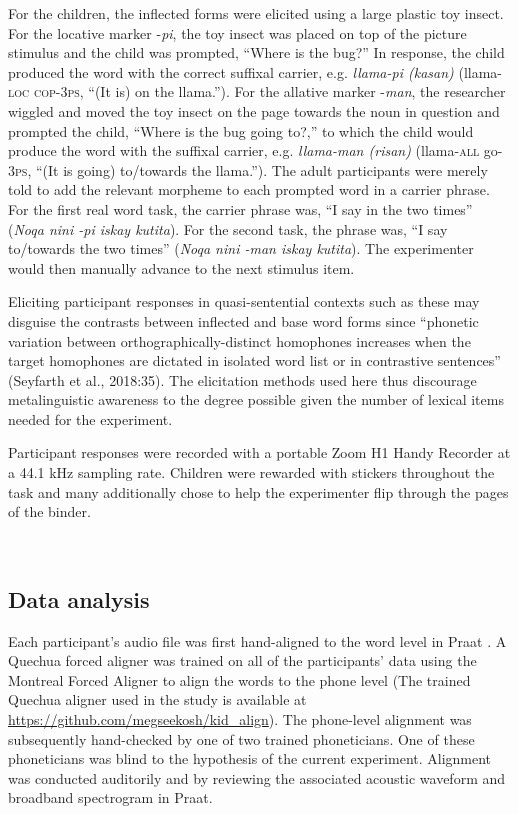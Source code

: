 \documentclass[a4paper,man,floatsintext,natbib,donotrepeattitle, apacite]{apa6}
\begin{document}
For the children, the inflected forms were elicited using a large plastic toy insect. For the locative marker -\textit{pi}, the toy insect was placed on top of the picture stimulus and the child was prompted, “Where is the bug?” In response, the child produced the word with the correct suffixal carrier, e.g. \textit{llama-pi (kasan)} (llama-\textsc{loc} \textsc{cop-3ps}, ``(It is) on the llama.''). For the allative marker -\textit{man}, the researcher wiggled and moved the toy insect on the page towards the noun in question and prompted the child, ``Where is the bug going to?,'' to which the child would produce the word with the suffixal carrier, e.g. \textit{llama-man (risan)} (llama-\textsc{all} go\textsc{-3ps}, ``(It is going) to/towards the llama.''). The adult participants were merely told to add the relevant morpheme to each prompted word in a carrier phrase. For the first real word task, the carrier phrase was, ``I say in the \underline{\hspace{1cm}} two times'' (\textit{Noqa nini \underline{\hspace{1cm}}-pi iskay kutita}). For the second task, the phrase was, ``I say to/towards the \underline{\hspace{1cm}} two times'' (\textit{Noqa nini \underline{\hspace{1cm}}-man iskay kutita}). The experimenter would then manually advance to the next stimulus item. 

Eliciting participant responses in quasi-sentential contexts such as these may disguise the contrasts between inflected and base word forms since ``phonetic variation between orthographically-distinct homophones increases when the target homophones are dictated in isolated word list or in contrastive sentences'' (Seyfarth et al., 2018:35). The elicitation methods used here thus discourage metalinguistic awareness to the degree possible given the number of lexical items needed for the experiment.  

Participant responses were recorded with a portable Zoom H1 Handy Recorder at a 44.1 kHz sampling rate. Children were rewarded with stickers throughout the task and many additionally chose to help the experimenter flip through the pages of the binder.

~
~

\subsection{Data analysis}

Each participant's audio file was first hand-aligned to the word level in Praat \citep{boersmaPraatDoingPhonetics2018}. A Quechua forced aligner was trained on all of the participants' data using the Montreal Forced Aligner \citep{mcauliffeMontrealForcedAligner2017} to align the words to the phone level (The trained Quechua aligner used in the study is available at \url{https://github.com/megseekosh/kid_align}). The phone-level alignment was subsequently hand-checked by one of two trained phoneticians. One of these phoneticians was blind to the hypothesis of the current experiment. Alignment was conducted auditorily and by reviewing the associated acoustic waveform and broadband spectrogram in Praat. 
\end{document}
